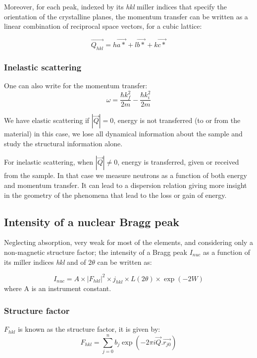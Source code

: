 Moreover, for each peak, indexed by its \textit{hkl} miller indices that specify the orientation of the crystalline planes, the momentum transfer can be written as a linear combination of reciprocal space vectors, for a cubic lattice:

\begin{equation}
    \label{eq:Qhkl}
    \vec{Q_{hkl}} = h\vec{a*} + l\vec{b*} + k\vec{c*}
\end{equation}{}

\subsubsection{Inelastic scattering}
One can also write for the momentum transfer:
\begin{equation}
\label{MomTransfer}
    \omega=\frac{\hbar k_f^2}{2m}-\frac{\hbar k_i^2}{2m}
\end{equation}

We have elastic scattering if $|\vec{Q}|=0$, energy is not transferred (to or from the material) in this case, we lose all dynamical information about the sample and study the structural information alone.

For inelastic scattering, when $|\vec{Q}|\neq0$, energy is transferred, given or received from the sample. In that case we measure neutrons as a function of both energy and momentum transfer. It can lead to a dispersion relation giving more insight in the geometry of the phenomena that lead to the loss or gain of energy.

\subsection{Intensity of a nuclear Bragg peak}
Neglecting absorption, very weak for most of the elements, and considering only a non-magnetic structure factor; the intensity of a Bragg peak $I_{nuc}$ as a function of its miller indices \textit{hkl} and of $2\theta$ can be written as:

\begin{equation}
    \label{eq:PeakIntensity}
    I_{nuc} = A \times |F_{hkl}|^2  \times j_{hkl} \times L(2\theta) \times \exp{(-2W)}
\end{equation}
where A is an instrument constant.

\subsubsection{Structure factor}
$F_{hkl}$ is known as the structure factor, it is given by:
\begin{equation}
    \label{eq:StrucFactor}
    F_{hkl} = \sum_{j=0}^n b_j \exp{(-2\pi i \vec{Q}. \vec{r_{j0}})}
\end{equation}{}

